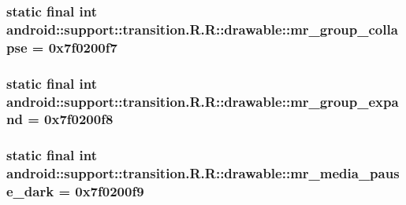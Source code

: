 \hypertarget{classandroid_1_1support_1_1transition_1_1_r_1_1drawable_41ee544b95f15225679df35c740473ef}{
\subsubsection[{mr\_\-group\_\-collapse}]{\setlength{\rightskip}{0pt plus 5cm}static final int android::support::transition.R.R::drawable::mr\_\-group\_\-collapse = 0x7f0200f7}}
\label{classandroid_1_1support_1_1transition_1_1_r_1_1drawable_41ee544b95f15225679df35c740473ef}


\hypertarget{classandroid_1_1support_1_1transition_1_1_r_1_1drawable_680924c5f94bc2ba11af3d6628fa6928}{
\subsubsection[{mr\_\-group\_\-expand}]{\setlength{\rightskip}{0pt plus 5cm}static final int android::support::transition.R.R::drawable::mr\_\-group\_\-expand = 0x7f0200f8}}
\label{classandroid_1_1support_1_1transition_1_1_r_1_1drawable_680924c5f94bc2ba11af3d6628fa6928}


\hypertarget{classandroid_1_1support_1_1transition_1_1_r_1_1drawable_ede22d84d784a88e1363b5f5544b47cb}{
\subsubsection[{mr\_\-media\_\-pause\_\-dark}]{\setlength{\rightskip}{0pt plus 5cm}static final int android::support::transition.R.R::drawable::mr\_\-media\_\-pause\_\-dark = 0x7f0200f9}}
\label{classandroid_1_1support_1_1transition_1_1_r_1_1drawable_ede22d84d784a88e1363b5f5544b47cb}


